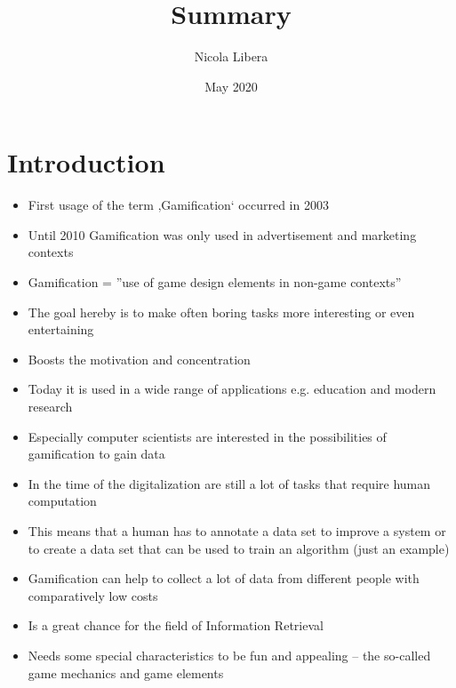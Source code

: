 \documentclass{article}
\theoremstyle{definition}
\theoremstyle{remark}
\begin{document}
\title{Summary}
\author{\vspace{-2.0cm} Nicola Libera}
\date{May 2020}
\maketitle

\section{Introduction}
\begin{itemize}
    \item First usage of the term ‚Gamification‘ occurred in 2003 \cite{gamification}
    \item Until 2010 Gamification was only used in advertisement and marketing contexts \cite{gamification}
    \item Gamification = ''use of game design elements in non-game contexts'' \cite{gamification}
    \item The goal hereby is to make often boring tasks more interesting or even entertaining
    \item Boosts the motivation and concentration 
    \item Today it is used in a wide range of applications e.g. education and modern research
    \item Especially computer scientists are interested in the possibilities of gamification to gain data 
    \item In the time of the digitalization are still a lot of tasks that require human computation
    \item This means that a human has to annotate a data set to improve a system or to create a data set that can be used to train an algorithm (just an example)
    \item Gamification can help to collect a lot of data from different people with comparatively low costs
    \item Is a great chance for the field of Information Retrieval
    \item Needs some special characteristics to be fun and appealing – the so-called game mechanics and game elements
\end{itemize}
\end{document}
